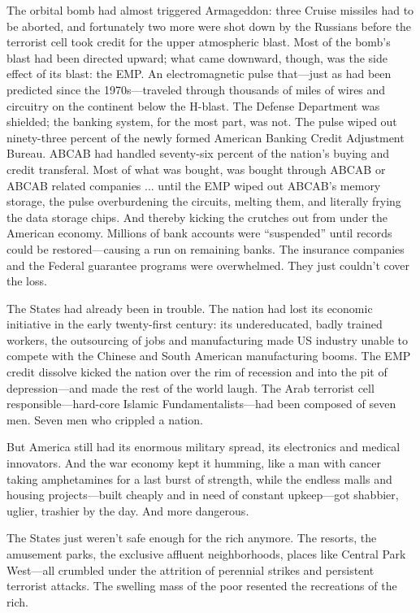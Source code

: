 The orbital bomb had almost triggered Armageddon: three Cruise missiles had to be aborted, and fortunately two more were shot down by the Russians before the terrorist cell took credit for the upper atmospheric blast. Most of the bomb's blast had been directed upward; what came downward, though, was the side effect of its blast: the EMP. An electromagnetic pulse that—just as had been predicted since the 1970s—traveled through thousands of miles of wires and circuitry on the continent below the H-blast. The Defense Department was shielded; the banking system, for the most part, was not. The pulse wiped out ninety-three percent of the newly formed American Banking Credit Adjustment Bureau. ABCAB had handled seventy-six percent of the nation's buying and credit transferal. Most of what was bought, was bought through ABCAB or ABCAB related companies ... until the EMP wiped out ABCAB's memory storage, the pulse overburdening the circuits, melting them, and literally frying the data storage chips. And thereby kicking the crutches out from under the American economy. Millions of bank accounts were ``suspended'' until records could be restored—causing a run on remaining banks. The insurance companies and the Federal guarantee programs were overwhelmed. They just couldn't cover the loss.

The States had already been in trouble. The nation had lost its economic initiative in the early twenty-first century: its undereducated, badly trained workers, the outsourcing of jobs and manufacturing made US industry unable to compete with the Chinese and South American manufacturing booms. The EMP credit dissolve kicked the nation over the rim of recession and into the pit of depression—and made the rest of the world laugh. The Arab terrorist cell responsible—hard-core Islamic Fundamentalists—had been composed of seven men. Seven men who crippled a nation.

But America still had its enormous military spread, its electronics and medical innovators. And the war economy kept it humming, like a man with cancer taking amphetamines for a last burst of strength, while the endless malls and housing projects—built cheaply and in need of constant upkeep—got shabbier, uglier, trashier by the day. And more dangerous.

The States just weren't safe enough for the rich anymore. The resorts, the amusement parks, the exclusive affluent neighborhoods, places like Central Park West—all crumbled under the attrition of perennial strikes and persistent terrorist attacks. The swelling mass of the poor resented the recreations of the rich.

